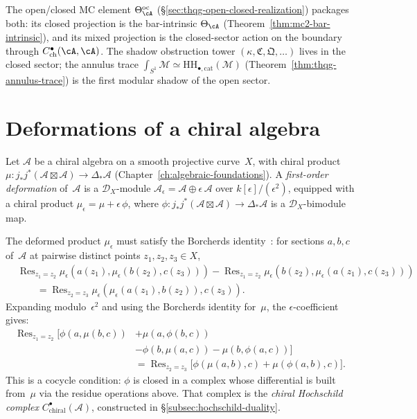 The open/closed MC element $\Theta^{\mathrm{oc}}_\cA$
(\S\ref{sec:thqg-open-closed-realization}) packages both:
its closed projection is the bar-intrinsic $\Theta_\cA$
(Theorem~\ref{thm:mc2-bar-intrinsic}), and its mixed projection
is the closed-sector action on the boundary through
$C^\bullet_{\mathrm{ch}}(\cA, \cA)$. The shadow obstruction tower
$(\kappa, \mathfrak{C}, \mathfrak{Q}, \ldots)$ lives in the closed
sector; the annulus trace
$\int_{S^1} \mathcal{M}
\simeq \mathrm{HH}_{\bullet,\mathrm{cat}}(\mathcal{M})$
(Theorem~\ref{thm:thqg-annulus-trace}) is the first modular shadow
of the open sector.

\section{Deformations of a chiral algebra}

Let $\mathcal{A}$ be a chiral algebra on a smooth projective curve~$X$,
with chiral product
$\mu\colon j_*j^*(\mathcal{A}\boxtimes\mathcal{A})\to\Delta_*\mathcal{A}$
(Chapter~\ref{ch:algebraic-foundations}).
A \emph{first-order deformation} of~$\mathcal{A}$ is a
$\mathcal{D}_X$-module
$\mathcal{A}_\epsilon = \mathcal{A}\oplus\epsilon\,\mathcal{A}$
over $k[\epsilon]/(\epsilon^2)$, equipped with a chiral product
$\mu_\epsilon = \mu + \epsilon\,\phi$, where
$\phi\colon j_*j^*(\mathcal{A}\boxtimes\mathcal{A})\to\Delta_*\mathcal{A}$
is a $\mathcal{D}_X$-bimodule map.

The deformed product $\mu_\epsilon$ must satisfy the Borcherds
identity~\cite{Bor92,BD04}:
for sections $a,b,c$ of~$\mathcal{A}$ at pairwise distinct points
$z_1,z_2,z_3\in X$,
\[
\begin{aligned}
 &\operatorname{Res}_{z_1\!=z_2}\!\mu_\epsilon(a(z_1),\mu_\epsilon(b(z_2),c(z_3)))
 - \operatorname{Res}_{z_1\!=z_2}\!\mu_\epsilon(b(z_2),\mu_\epsilon(a(z_1),c(z_3)))\\
 &\qquad= \operatorname{Res}_{z_2\!=z_3}\!\mu_\epsilon(\mu_\epsilon(a(z_1),b(z_2)),c(z_3)).
\end{aligned}
\]
Expanding modulo~$\epsilon^2$ and using the Borcherds identity for~$\mu$,
the $\epsilon$-coefficient gives:
\begin{equation}\label{eq:deformation-cocycle}
\begin{split}
 \operatorname{Res}_{z_1\!=z_2}\!\bigl[\phi(a,\mu(b,c))
 &+ \mu(a,\phi(b,c))\\
 &- \phi(b,\mu(a,c))
 - \mu(b,\phi(a,c))\bigr]\\
 &= \operatorname{Res}_{z_2\!=z_3}\!\bigl[\phi(\mu(a,b),c)
 + \mu(\phi(a,b),c)\bigr].
\end{split}
\end{equation}
This is a cocycle condition: $\phi$ is closed in a complex whose
differential is built from~$\mu$ via the residue operations above.
That complex is the \emph{chiral Hochschild complex}
$C^{\bullet}_{\mathrm{chiral}}(\mathcal{A})$, constructed in
\S\ref{subsec:hochschild-duality}.

